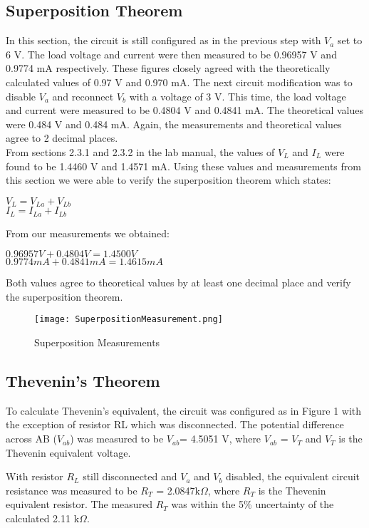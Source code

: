 \documentclass[12pt]{article}
\begin{document}
\subsection{Superposition Theorem}
In this section, the circuit is still configured as in the previous step with $V_{a}$ set to 6 V. The load voltage and current were then measured to be 0.96957 V and 0.9774 mA respectively. These figures closely agreed with the theoretically calculated values of 0.97 V and 0.970 mA. The next circuit modification was to disable $V_{a}$ and reconnect $V_{b}$ with a voltage of 3 V. This time, the load voltage and current were measured to be 0.4804 V and 0.4841 mA. The theoretical values were 0.484 V and 0.484 mA. Again, the measurements and theoretical values agree to 2 decimal places.\\
From sections 2.3.1 and 2.3.2 in the lab manual, the values of $V_{L}$ and $I_{L}$ were found to be 1.4460 V and 1.4571 mA. Using these values and measurements from this section we were able to verify the superposition theorem which states:
\begin{center}
	$V_{L} = V_{La}+V_{Lb}$\\
	$I_{L} = I_{La}+I_{Lb}$
\end{center}
From our measurements we obtained:
\begin{center}
$0.96957 V + 0.4804 V = 1.4500 V$\\
$0.9774 mA + 0.4841 mA = 1.4615 mA$	
\end{center}
Both values agree to theoretical values by at least one decimal place and verify the superposition theorem.
\begin{figure}[htbp]
	\centering
	\texttt{[image: SuperpositionMeasurement.png]}
	\caption{Superposition Measurements}
	\label{fig.superMeasure}
\end{figure}
\pagebreak
\subsection{Thevenin's Theorem}
To calculate Thevenin’s equivalent, the circuit was configured as in Figure 1 with the exception of resistor RL which was disconnected. The potential difference across AB ($V_{ab}$) was measured to be $V_{ab}$= 4.5051 V, where $V_{ab}$ = $V_{T}$ and $V_{T}$ is the Thevenin equivalent voltage.

With resistor $R_{L}$ still disconnected and $V_{a}$ and $V_{b}$ disabled, the equivalent circuit resistance was measured to be $R_{T}$ = 2.0847k$\Omega$, where $R_{T}$ is the Thevenin equivalent resistor. The measured $R_{T}$ was within the 5\% uncertainty of the calculated 2.11 k$\Omega$.
\end{document}
